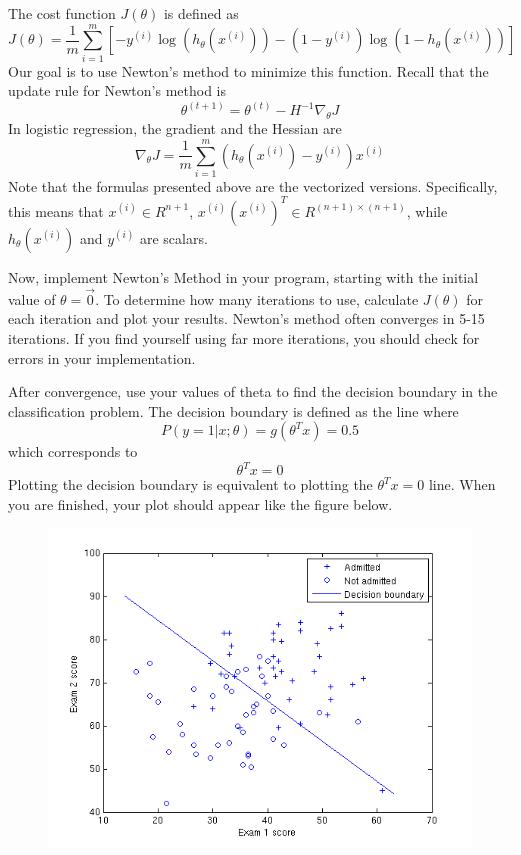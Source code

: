 \documentclass[10pt,a4paper]{article}
\begin{document}
  The cost function $J(\theta)$ is defined as 
  \begin{displaymath}
    J(\theta) = \frac{1}{m} \sum^m_{i=1} [ -y^{(i)} \log(h_\theta(x^{(i)})) - (1-y^{(i)}) \log (1 - h_\theta(x^{(i)}))  ]
  \end{displaymath}  
  Our goal is to use Newton's method to minimize this function. Recall that the update rule for Newton's method is 
  \begin{displaymath}
    \theta^{(t+1)}=\theta^{(t)}-H^{-1}\nabla_{\theta}J \nonumber
  \end{displaymath}  
  In logistic regression, the gradient and the Hessian are 
  \begin{displaymath}
    \nabla_{\theta}J = \frac{1}{m}\sum_{i=1}^{m}(h_{\theta}(x^{(i)})-y^{(i)})x^{(i)} \nonumber \nonumber
  \end{displaymath}  
  Note that the formulas presented above are the vectorized versions. Specifically, this means that $x^{(i)} \in R^{n+1}$, $ x^{(i)}\left(x^{(i)}\right)^{T}\in R^{(n+1) \times (n+1)}$, while $h_{\theta}(x^{(i)})$ and $y^{(i)}$ are scalars.


  Now, implement Newton's Method in your program, starting with the initial value of  $\theta = \vec{0}$. To determine how many iterations to use, calculate $J(\theta)$ for each iteration and plot your results. Newton's method often converges in 5-15 iterations. If you find yourself using far more iterations, you should check for errors in your implementation.

  After convergence, use your values of theta to find the decision boundary in the classification problem. The decision boundary is defined as the line where 
  \begin{displaymath}
      P(y=1\vert x; \theta) = g(\theta^T x) = 0.5
  \end{displaymath}
  which corresponds to 
  \begin{displaymath}
    \theta^T x = 0
  \end{displaymath}
  Plotting the decision boundary is equivalent to plotting the  $\theta^T x = 0$ line. When you are finished, your plot should appear like the figure below.
  \begin{figure}[htb!]
    \centering
      \includegraphics[width=.7\columnwidth]{ex4regression}
  \end{figure}
\end{document}
